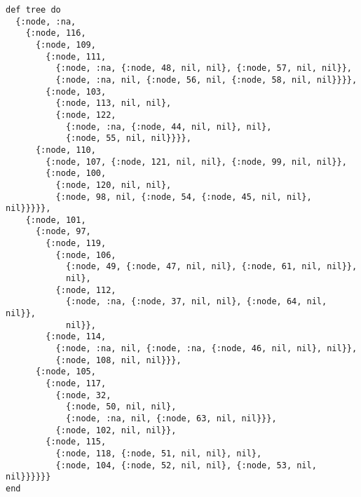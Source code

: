 \documentclass[a4paper,11pt]{article}
\begin{document}
\begin{verbatim}
def tree do
  {:node, :na,
    {:node, 116,
      {:node, 109,
        {:node, 111,
          {:node, :na, {:node, 48, nil, nil}, {:node, 57, nil, nil}},
          {:node, :na, nil, {:node, 56, nil, {:node, 58, nil, nil}}}},
        {:node, 103,
          {:node, 113, nil, nil},
          {:node, 122,
            {:node, :na, {:node, 44, nil, nil}, nil},
            {:node, 55, nil, nil}}}},
      {:node, 110,
        {:node, 107, {:node, 121, nil, nil}, {:node, 99, nil, nil}},
        {:node, 100,
          {:node, 120, nil, nil},
          {:node, 98, nil, {:node, 54, {:node, 45, nil, nil}, nil}}}}},
    {:node, 101,
      {:node, 97,
        {:node, 119,
          {:node, 106,
            {:node, 49, {:node, 47, nil, nil}, {:node, 61, nil, nil}},
            nil},
          {:node, 112,
            {:node, :na, {:node, 37, nil, nil}, {:node, 64, nil, nil}},
            nil}},
        {:node, 114,
          {:node, :na, nil, {:node, :na, {:node, 46, nil, nil}, nil}},
          {:node, 108, nil, nil}}},
      {:node, 105,
        {:node, 117,
          {:node, 32,
            {:node, 50, nil, nil},
            {:node, :na, nil, {:node, 63, nil, nil}}},
          {:node, 102, nil, nil}},
        {:node, 115,
          {:node, 118, {:node, 51, nil, nil}, nil},
          {:node, 104, {:node, 52, nil, nil}, {:node, 53, nil, nil}}}}}}
end
\end{verbatim}
\end{document}
